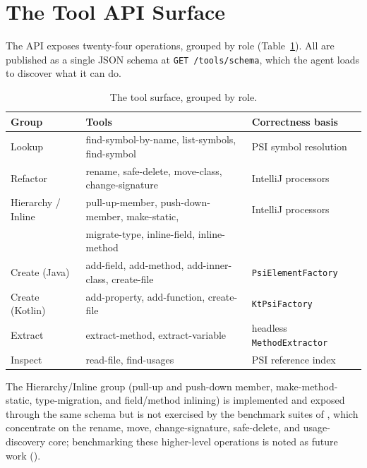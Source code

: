 \section{The Tool API Surface}
\label{sec:design-tools}

The API exposes twenty-four operations, grouped by role
(Table~\ref{tab:tools}). All are published as a single JSON schema at
\texttt{GET /tools/schema}, which the agent loads to discover what it can do.

\begin{table}[h]
\centering
\caption{The tool surface, grouped by role.}
\label{tab:tools}
\begin{tabular}{@{}lll@{}}
\toprule
Group & Tools & Correctness basis \\
\midrule
Lookup     & find-symbol-by-name, list-symbols, find-symbol & PSI symbol resolution \\
Refactor   & rename, safe-delete, move-class, change-signature & IntelliJ processors \\
Hierarchy / Inline & pull-up-member, push-down-member, make-static, & IntelliJ processors \\
           & migrate-type, inline-field, inline-method & \\
Create (Java)   & add-field, add-method, add-inner-class, create-file & \texttt{PsiElementFactory} \\
Create (Kotlin) & add-property, add-function, create-file & \texttt{KtPsiFactory} \\
Extract    & extract-method, extract-variable & headless \texttt{MethodExtractor} \\
Inspect    & read-file, find-usages & PSI reference index \\
\bottomrule
\end{tabular}
\end{table}

The Hierarchy/Inline group (pull-up and push-down member, make-method-static,
type-migration, and field/method inlining) is implemented and exposed through the same
schema but is not exercised by the benchmark suites of , which concentrate
on the rename, move, change-signature, safe-delete, and usage-discovery core; benchmarking
these higher-level operations is noted as future work ().


